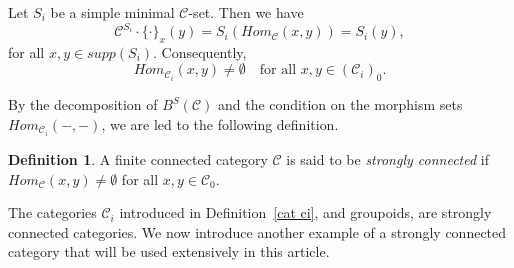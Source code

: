 \documentclass[a4paper]{article}
\theoremstyle{definition}
\newtheorem{defi}[thm]{Definition}
\theoremstyle{remark}
\newcommand*{\cat}[1]{\mathcal{#1}}
\begin{document}
Let $S_i$ be a simple minimal $\cat{C}$-set. Then we have
\[
\cat{C}^{S_i} \cdot \{\cdot\}_x(y)
= S_i(Hom_{\cat{C}}(x,y))
= S_i(y),
\]
for all $x,y \in supp(S_i)$. Consequently,
\[
Hom_{\cat{C}_i}(x,y) \neq \emptyset
\quad \text{for all } x,y \in (\cat{C}_i)_0.
\]

By the decomposition of $B^S(\cat{C})$ and the condition on the morphism
sets $Hom_{\cat{C}_i}(-,-)$, we are led to the following definition.
\begin{defi}
A finite connected category $\cat{C}$ is said to be \emph{strongly connected} if
$Hom_{\cat{C}}(x,y)\neq\emptyset$
for all $x,y\in\cat{C}_0$.
\end{defi}
The categories $\cat{C}_i$ introduced in Definition~\ref{cat ci}, and 
groupoids, are  strongly connected categories. We now introduce another example of a strongly connected category that will be used extensively in this article.
\end{document}
